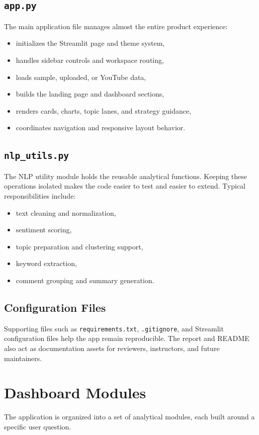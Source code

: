 \subsection{\texttt{app.py}}
The main application file manages almost the entire product experience:
\begin{itemize}
    \item initializes the Streamlit page and theme system,
    \item handles sidebar controls and workspace routing,
    \item loads sample, uploaded, or YouTube data,
    \item builds the landing page and dashboard sections,
    \item renders cards, charts, topic lanes, and strategy guidance,
    \item coordinates navigation and responsive layout behavior.
\end{itemize}

\subsection{\texttt{nlp\_utils.py}}
The NLP utility module holds the reusable analytical functions. Keeping these operations isolated makes the code easier to test and easier to extend. Typical responsibilities include:
\begin{itemize}
    \item text cleaning and normalization,
    \item sentiment scoring,
    \item topic preparation and clustering support,
    \item keyword extraction,
    \item comment grouping and summary generation.
\end{itemize}

\subsection{Configuration Files}
Supporting files such as \texttt{requirements.txt}, \texttt{.gitignore}, and Streamlit configuration files help the app remain reproducible. The report and README also act as documentation assets for reviewers, instructors, and future maintainers.

\section{Dashboard Modules}
The application is organized into a set of analytical modules, each built around a specific user question.

